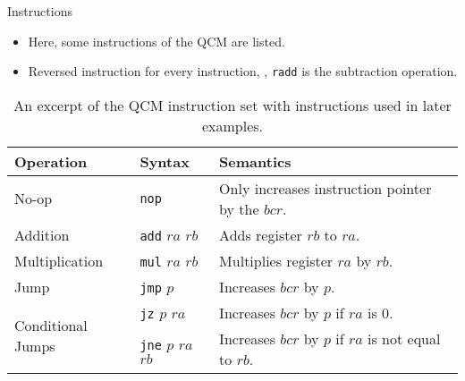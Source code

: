 \begin{frame}{Instructions}
    \begin{itemize}
        \item Here, some instructions of the QCM are listed.
        \item Reversed instruction for every instruction, \eg, \texttt{radd} is the subtraction operation.
    \end{itemize}
    \vfill
    \begin{table}[htp]
        \centering
        \begin{tabular}{llp{}}
            \multicolumn{1}{l|}{Operation}                          & \multicolumn{1}{l|}{Syntax}                                      & Semantics                                                              \\ \hline
            
            \multicolumn{1}{l|}{No-op}                              & \multicolumn{1}{l|}{\texttt{nop}}               & Only increases instruction pointer by the $bcr$.     \\ \hline
            
            \multicolumn{1}{l|}{Addition}                           & \multicolumn{1}{l|}{\texttt{add} $ra$ $rb$}     & Adds register $rb$ to $ra$.                                            \\
            \multicolumn{1}{l|}{Multiplication}                     & \multicolumn{1}{l|}{\texttt{mul} $ra$ $rb$}     & Multiplies register $ra$ by $rb$.                                      \\ \hline
            
            \multicolumn{1}{l|}{Jump}                               & \multicolumn{1}{l|}{\texttt{jmp} $p$}           & Increases $bcr$ by $p$.                              \\ \hline
            \multicolumn{1}{l|}{\multirow{2}{*}{Conditional Jumps}} & \multicolumn{1}{l|}{\texttt{jz} $p$ $ra$}       & Increases $bcr$ by $p$ if $ra$ is $0$.               \\
            \multicolumn{1}{l|}{}                                   & \multicolumn{1}{l|}{\texttt{jne} $p$ $ra$ $rb$} & Increases $bcr$ by $p$ if $ra$ is not equal to $rb$. 
        \end{tabular}
        \caption{An excerpt of the QCM instruction set with instructions used in later examples.}
    \end{table}
\end{frame}

